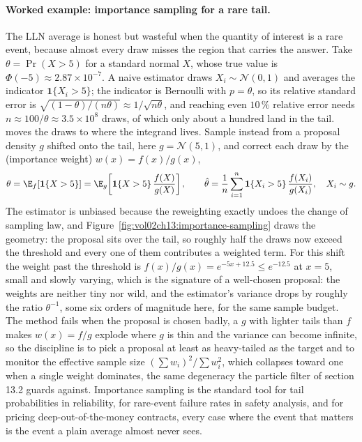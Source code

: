 \paragraph{Worked example: importance sampling for a rare tail.} The
LLN average is honest but wasteful when the quantity of interest is a
rare event, because almost every draw misses the region that carries the
answer. Take $\theta = \Pr(X > 5)$ for a standard normal $X$, whose true
value is $\Phi(-5) \approx 2.87 \times 10^{-7}$. A naive estimator draws
$X_{i} \sim \mathcal{N}(0, 1)$ and averages the indicator
$\mathbf{1}\{X_{i} > 5\}$; the indicator is Bernoulli with $p = \theta$,
so its relative standard error is $\sqrt{(1 - \theta)/(n\theta)} \approx
1/\sqrt{n\theta}$, and reaching even $10\,\%$ relative error needs $n
\approx 100/\theta \approx 3.5 \times 10^{8}$ draws, of which only about
a hundred land in the tail.  moves the
draws to where the integrand lives. Sample instead from a proposal
density $g$ shifted onto the tail, here $g = \mathcal{N}(5, 1)$, and
correct each draw by the  (importance weight)
$w(x) = f(x)/g(x)$,
\[
\theta = \E_{f}[\mathbf{1}\{X > 5\}]
= \E_{g}\!\left[\mathbf{1}\{X > 5\}\,\frac{f(X)}{g(X)}\right],
\qquad
\hat\theta = \frac{1}{n}\sum_{i=1}^{n}
\mathbf{1}\{X_{i} > 5\}\,\frac{f(X_{i})}{g(X_{i})},
\quad X_{i} \sim g.
\]
The estimator is unbiased because the reweighting exactly undoes the
change of sampling law, and Figure~\ref{fig:vol02ch13:importance-sampling}
draws the geometry: the proposal sits over the tail, so roughly half the
draws now exceed the threshold and every one of them contributes a
weighted term. For this shift the weight past the threshold is $f(x)/g(x)
= e^{-5x + 12.5} \leq e^{-12.5}$ at $x = 5$, small and slowly varying,
which is the signature of a well-chosen proposal: the weights are neither
tiny nor wild, and the estimator's variance drops by roughly the ratio
$\theta^{-1}$, some six orders of magnitude here, for the same sample
budget. The method fails when the proposal is chosen badly, a $g$ with
lighter tails than $f$ makes $w(x) = f/g$ explode where $g$ is thin and
the variance can become infinite, so the discipline is to pick a proposal
at least as heavy-tailed as the target and to monitor the effective
sample size $(\sum w_{i})^{2}/\sum w_{i}^{2}$, which collapses toward one
when a single weight dominates, the same degeneracy the particle filter
of section 13.2 guards against. Importance sampling is the standard tool
for tail probabilities in reliability, for rare-event failure rates in
safety analysis, and for pricing deep-out-of-the-money contracts, every
case where the event that matters is the event a plain average almost
never sees.

